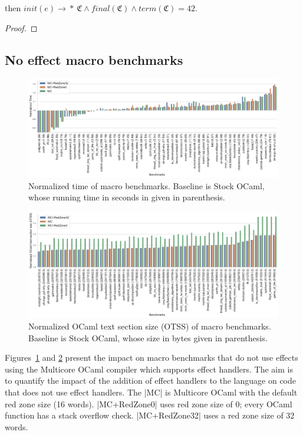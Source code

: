 \documentclass[sigplan,10pt,review,anonymous]{acmart}\settopmatter{printfolios=true,printccs=false,printacmref=false}
\newcommand{\config}{\mathfrak{C}}
\newcommand{\multistep}{\rightarrow\!\!*}
\begin{document}
then $init(e) \multistep ~\config \wedge final(\config) \wedge term(\config) =
42$.

\begin{proof}
\end{proof}
\fi

\subsection*{No effect macro benchmarks}

\begin{figure}
	\includegraphics[angle=90,scale=0.44]{sandmark-notebook/sandmark_time}
	\caption{Normalized time of macro benchmarks. Baseline is Stock OCaml,
		whose running time in seconds in given in parenthesis.}
	\label{res:macro_time}
\end{figure}

\begin{figure}
	\includegraphics[angle=90,scale=0.44]{sandmark-notebook/sandmark_codesize}
	\caption{Normalized OCaml text section size (OTSS) of macro benchmarks.
	Baseline is Stock OCaml, whose size in bytes given in parenthesis.}
	\label{res:macro_size}
\end{figure}

Figures~\ref{res:macro_time} and \ref{res:macro_size} present the impact on
macro benchmarks that do not use effects using the Multicore OCaml compiler
which supports effect handlers. The aim is to quantify the impact of the
addition of effect handlers to the language on code that does not use effect
handlers. The |MC| is Multicore OCaml with the default red zone size (16
words). |MC+RedZone0| uses red zone size of 0; every OCaml function has a stack
overflow check. |MC+RedZone32| uses a red zone size of 32 words.
\end{document}
